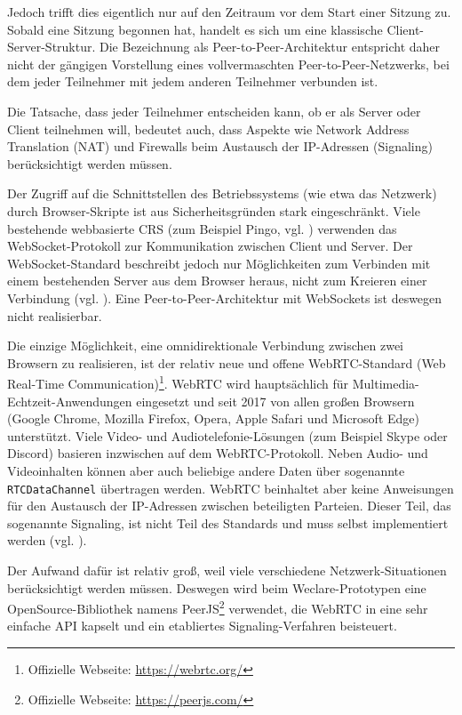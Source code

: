 Jedoch trifft dies eigentlich nur auf den Zeitraum vor dem Start einer Sitzung zu. Sobald eine Sitzung begonnen hat, handelt es sich um eine klassische Client-Server-Struktur. Die Bezeichnung als Peer-to-Peer-Architektur entspricht daher nicht der gängigen Vorstellung eines vollvermaschten Peer-to-Peer-Netzwerks, bei dem jeder Teilnehmer mit jedem anderen Teilnehmer verbunden ist.

Die Tatsache, dass jeder Teilnehmer entscheiden kann, ob er als Server oder Client teilnehmen will, bedeutet auch, dass Aspekte wie Network Address Translation (NAT) und Firewalls beim Austausch der IP-Adressen (Signaling) berücksichtigt werden müssen.

Der Zugriff auf die Schnittstellen des Betriebssystems (wie etwa das Netzwerk) durch Browser-Skripte ist aus Sicherheitsgründen stark eingeschränkt. Viele bestehende webbasierte CRS (zum Beispiel Pingo, vgl. \cite{web:pingo_github}) verwenden das WebSocket-Protokoll zur Kommunikation zwischen Client und Server. Der WebSocket-Standard beschreibt jedoch nur Möglichkeiten zum Verbinden mit einem bestehenden Server aus dem Browser heraus, nicht zum Kreieren einer Verbindung (vgl. \cite{std:websockets}). Eine Peer-to-Peer-Architektur mit WebSockets ist deswegen nicht realisierbar.

Die einzige Möglichkeit, eine omnidirektionale Verbindung zwischen zwei Browsern zu realisieren, ist der relativ neue und offene WebRTC-Standard (Web Real-Time Communication)\footnote{Offizielle Webseite: \url{https://webrtc.org/}}. WebRTC wird hauptsächlich für Multimedia-Echtzeit-Anwendungen eingesetzt und seit 2017 von allen großen Browsern (Google Chrome, Mozilla Firefox, Opera, Apple Safari und Microsoft Edge) unterstützt. Viele Video- und Audiotelefonie-Lösungen (zum Beispiel Skype oder Discord) basieren inzwischen auf dem WebRTC-Protokoll. Neben Audio- und Videoinhalten können aber auch beliebige andere Daten über sogenannte \texttt{RTCDataChannel} übertragen werden. WebRTC beinhaltet aber keine Anweisungen für den Austausch der IP-Adressen zwischen beteiligten Parteien. Dieser Teil, das sogenannte Signaling, ist nicht Teil des Standards und muss selbst implementiert werden (vgl. \cite{web:webrtc_signaling}).

Der Aufwand dafür ist relativ groß, weil viele verschiedene Netzwerk-Situationen berücksichtigt werden müssen. Deswegen wird beim Weclare-Prototypen eine OpenSource-Bibliothek namens PeerJS\footnote{Offizielle Webseite: \url{https://peerjs.com/}} verwendet, die WebRTC in eine sehr einfache API kapselt und ein etabliertes Signaling-Verfahren beisteuert.

